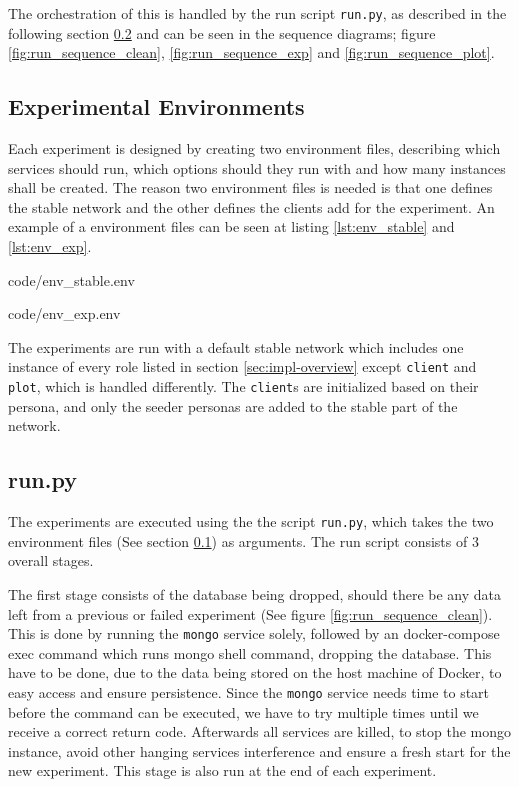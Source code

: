 The orchestration of this is handled by the run script \texttt{run.py}, as described in the following section \ref{sec:experiment_run} and can be seen in the sequence diagrams; figure \ref{fig:run_sequence_clean}, \ref{fig:run_sequence_exp} and \ref{fig:run_sequence_plot}.

\subsection{Experimental Environments}
\label{sec:experiment_env}
Each experiment is designed by creating two environment files, describing which services should run, which options should they run with and how many instances shall be created. The reason two environment files is needed is that one defines the stable network and the other defines the clients add for the experiment. An example of a environment files can be seen at listing \ref{lst:env_stable} and \ref{lst:env_exp}.

\noindent\begin{minipage}[t]{.35\textwidth}

                {code/env_stable.env}
\end{minipage}
\hfill
\begin{minipage}[t]{.52\textwidth}

                {code/env_exp.env}
\end{minipage}\bigskip

The experiments are run with a default stable network which includes one instance of every role listed in section \ref{sec:impl-overview} except \texttt{client} and \texttt{plot}, which is handled differently. The \texttt{client}s are initialized based on their persona, and only the seeder personas are added to the stable part of the network.

\subsection{run.py}
\label{sec:experiment_run}
The experiments are executed using the the script \texttt{run.py}, which takes the two environment files (See section \ref{sec:experiment_env}) as arguments. The run script consists of 3 overall stages.

The first stage consists of the database being dropped, should there be any data left from a previous or failed experiment (See figure \ref{fig:run_sequence_clean}). This is done by running the \texttt{mongo} service solely, followed by an docker-compose exec command which runs mongo shell command, dropping the database. This have to be done, due to the data being stored on the host machine of Docker, to easy access and ensure persistence. Since the \texttt{mongo} service needs time to start before the command can be executed, we have to try multiple times until  we receive a correct return code. Afterwards all services are killed, to stop the mongo instance, avoid other hanging services interference and ensure a fresh start for the new experiment. This stage is also run at the end of each experiment.


